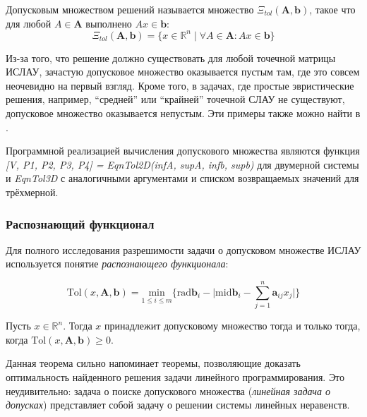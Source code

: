 \begin{definition}
	Допусковым множеством решений называется множество $\Xi_{tol}(\mathbf{A}, \mathbf{b})$, такое что для любой $A \in \mathbf{A}$ выполнено $Ax \in \mathbf{b}$:
	\begin{equation}
	\Xi_{tol}(\mathbf{A}, \mathbf{b}) = \{ x \in \mathbb{R}^n \; | \; \forall A \in \mathbf{A}: Ax \in \mathbf{b} \}
	\end{equation}
\end{definition}

Из-за того, что решение должно существовать для любой точечной матрицы ИСЛАУ, зачастую допусковое множество оказывается пустым там, где это совсем неочевидно на первый взгляд. Кроме того, в задачах, где простые эвристические решения, например, ``средней'' или ``крайней'' точечной СЛАУ не существуют, допусковое множество оказывается непустым. Эти примеры также можно найти в \cite{intv}.

Программной реализацией вычисления допускового множества являются функция \textit{[V, P1, P2, P3, P4] = EqnTol2D(infA, supA, infb, supb)} для двумерной системы и \textit{EqnTol3D} с аналогичными аргументами и списком возвращаемых значений для трёхмерной.

\subsubsection{Распознающий функционал}

Для полного исследования разрешимости задачи о допусковом множестве ИСЛАУ используется понятие \textit{распознающего функционала}:

\begin{equation}
\textrm{Tol}(x, \mathbf{A}, \mathbf{b}) = \underset{1 \leq i \leq m}{\textrm{min}} \bigg \lbrace \textrm{rad} \mathbf{b}_i - \bigg| \textrm{mid} \mathbf{b}_i - \sum_{j=1}^{n} \mathbf{a}_{ij}x_j \bigg|  \bigg \rbrace
\end{equation}

\begin{theorem}
	Пусть $x \in \mathbb{R}^n$. Тогда $x$ принадлежит допусковому множество тогда и только тогда, когда $\textrm{Tol}(x, \mathbf{A}, \mathbf{b}) \geq 0$.
\end{theorem}

Данная теорема сильно напоминает теоремы, позволяющие доказать оптимальность найденного решения задачи линейного программирования. Это неудивительно: задача о поиске допускового множества (\textit{линейная задача о допусках}) представляет собой задачу о решении системы линейных неравенств.

